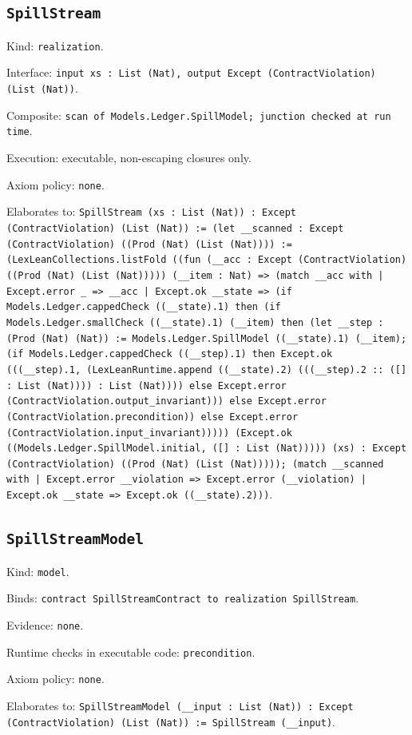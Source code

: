 \documentclass[11pt]{article}
\begin{document}
\subsection*{\texttt{SpillStream}}
\noindent Kind: \texttt{realization}.\par
\noindent Interface: \texttt{input xs : List (Nat), output Except (ContractViolation) (List (Nat))}.\par
\noindent Composite: \texttt{scan of Models.Ledger.SpillModel; junction checked at run time}.\par
\noindent Execution: executable, non-escaping closures only.\par
\noindent Axiom policy: \texttt{none}.\par
\noindent Elaborates to: \texttt{SpillStream (xs : List (Nat)) : Except (ContractViolation) (List (Nat)) := (let \_\_scanned : Except (ContractViolation) ((Prod (Nat) (List (Nat)))) := (LexLeanCollections.listFold ((fun (\_\_acc : Except (ContractViolation) ((Prod (Nat) (List (Nat))))) (\_\_item : Nat) => (match \_\_acc with | Except.error \_ => \_\_acc | Except.ok \_\_state => (if Models.Ledger.cappedCheck ((\_\_state).1) then (if Models.Ledger.smallCheck ((\_\_state).1) (\_\_item) then (let \_\_step : (Prod (Nat) (Nat)) := Models.Ledger.SpillModel ((\_\_state).1) (\_\_item); (if Models.Ledger.cappedCheck ((\_\_step).1) then Except.ok (((\_\_step).1, (LexLeanRuntime.append ((\_\_state).2) (((\_\_step).2 :: ([] : List (Nat)))) : List (Nat)))) else Except.error (ContractViolation.output\_invariant))) else Except.error (ContractViolation.precondition)) else Except.error (ContractViolation.input\_invariant))))) (Except.ok ((Models.Ledger.SpillModel.initial, ([] : List (Nat))))) (xs) : Except (ContractViolation) ((Prod (Nat) (List (Nat))))); (match \_\_scanned with | Except.error \_\_violation => Except.error (\_\_violation) | Except.ok \_\_state => Except.ok ((\_\_state).2)))}.\par
\subsection*{\texttt{SpillStreamModel}}
\noindent Kind: \texttt{model}.\par
\noindent Binds: \texttt{contract SpillStreamContract to realization SpillStream}.\par
\noindent Evidence: \texttt{none}.\par
\noindent Runtime checks in executable code: \texttt{precondition}.\par
\noindent Axiom policy: \texttt{none}.\par
\noindent Elaborates to: \texttt{SpillStreamModel (\_\_input : List (Nat)) : Except (ContractViolation) (List (Nat)) := SpillStream (\_\_input)}.\par
\end{document}
